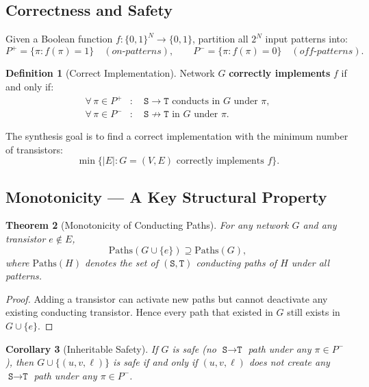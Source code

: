 \documentclass[11pt, a4paper]{article}
\theoremstyle{plain}
\newtheorem{theorem}{Theorem}[section]
\newtheorem{corollary}[theorem]{Corollary}
\theoremstyle{definition}
\newtheorem{definition}[theorem]{Definition}
\theoremstyle{remark}
\newcommand{\SOURCE}{\texttt{S}}
\newcommand{\SINK}{\texttt{T}}
\newcommand{\Pplus}{P^{+}}
\newcommand{\Pminus}{P^{-}}
\begin{document}
\subsection{Correctness and Safety}

Given a Boolean function $f : \{0,1\}^N \to \{0,1\}$, partition all
$2^N$ input patterns into:
\[
  \Pplus = \{\pi : f(\pi) = 1\}
  \quad(\textit{on-patterns}),
  \qquad
  \Pminus = \{\pi : f(\pi) = 0\}
  \quad(\textit{off-patterns}).
\]

\begin{definition}[Correct Implementation]
Network $G$ \textbf{correctly implements} $f$ if and only if:
\begin{align}
  \forall\,\pi \in \Pplus &:\quad
    \SOURCE \to \SINK \text{ conducts in } G \text{ under } \pi,
    \tag{Correctness} \\
  \forall\,\pi \in \Pminus &:\quad
    \SOURCE \not\to \SINK \text{ in } G \text{ under } \pi.
    \tag{Safety}
\end{align}
\end{definition}

The synthesis goal is to find a correct implementation with the
minimum number of transistors:
\[
  \min\bigl\{|E| : G = (V, E) \text{ correctly implements } f\bigr\}.
\]

\subsection{Monotonicity — A Key Structural Property}

\begin{theorem}[Monotonicity of Conducting Paths]
\label{thm:mono}
For any network $G$ and any transistor $e \notin E$,
\[
  \mathrm{Paths}(G \cup \{e\}) \supseteq \mathrm{Paths}(G),
\]
where $\mathrm{Paths}(H)$ denotes the set of $(\SOURCE,\SINK)$
conducting paths of $H$ under all patterns.
\end{theorem}

\begin{proof}
Adding a transistor can activate new paths but cannot deactivate
any existing conducting transistor.  Hence every path that existed
in $G$ still exists in $G \cup \{e\}$.
\end{proof}

\begin{corollary}[Inheritable Safety]
\label{cor:safety}
If $G$ is safe (no $\SOURCE \to \SINK$ path under any $\pi \in \Pminus$),
then $G \cup \{(u, v, \ell)\}$ is safe if and only if
$(u, v, \ell)$ does not create any $\SOURCE \to \SINK$ path under any
$\pi \in \Pminus$.
\end{corollary}
\end{document}
